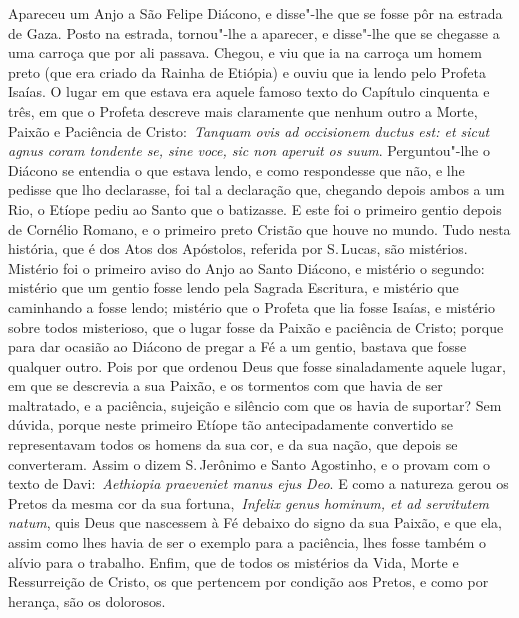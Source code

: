 Apareceu um Anjo a São Felipe Diácono, e disse"-lhe que se
fosse pôr na estrada de Gaza. Posto na estrada, tornou"-lhe a aparecer, e
disse"-lhe que se chegasse a uma carroça que por ali passava. Chegou, e
viu que ia na carroça um homem preto (que era criado da Rainha de
Etiópia) e ouviu que ia lendo pelo Profeta Isaías. O lugar em que estava
era aquele famoso texto do Capítulo cinquenta e três, em que o Profeta
descreve mais claramente que nenhum outro a Morte, Paixão e Paciência de
Cristo:~\emph{Tanquam ovis ad occisionem ductus est: et sicut agnus
coram tondente se, sine voce, sic non aperuit os
suum}. Perguntou"-lhe o Diácono se entendia o que
estava lendo, e como respondesse que não, e lhe pedisse que lho
declarasse, foi tal a declaração que, chegando depois ambos a um Rio, o
Etíope pediu ao Santo que o batizasse. E este foi o primeiro gentio
depois de Cornélio Romano, e o primeiro preto Cristão que houve no
mundo. Tudo nesta história, que é dos Atos dos Apóstolos, referida por
S.\,Lucas, são mistérios. Mistério foi o primeiro aviso do Anjo ao Santo
Diácono, e mistério o segundo: mistério que um gentio fosse lendo pela
Sagrada Escritura, e mistério que caminhando a fosse lendo; mistério que
o Profeta que lia fosse Isaías, e mistério sobre todos misterioso, que o
lugar fosse da Paixão e paciência de Cristo; porque para dar ocasião ao
Diácono de pregar a Fé a um gentio, bastava que fosse qualquer outro.
Pois por que ordenou Deus que fosse sinaladamente aquele lugar, em que
se descrevia a sua Paixão, e os tormentos com que havia de ser
maltratado, e a paciência, sujeição e silêncio com que os havia de
suportar? Sem dúvida, porque neste primeiro Etíope tão antecipadamente
convertido se representavam todos os homens da sua cor, e da sua nação,
que depois se converteram. Assim o dizem S.\,Jerônimo e Santo Agostinho,
e o provam com o texto de Davi:~\emph{Aethiopia praeveniet manus ejus
Deo}. E como a natureza gerou os Pretos da mesma cor
da sua fortuna,~\emph{Infelix genus hominum, et ad servitutem
natum}, quis Deus que nascessem à Fé debaixo do signo
da sua Paixão, e que ela, assim como lhes havia de ser o exemplo para a
paciência, lhes fosse também o alívio para o trabalho. Enfim, que de
todos os mistérios da Vida, Morte e Ressurreição de Cristo, os que
pertencem por condição aos Pretos, e como por herança, são os dolorosos.


